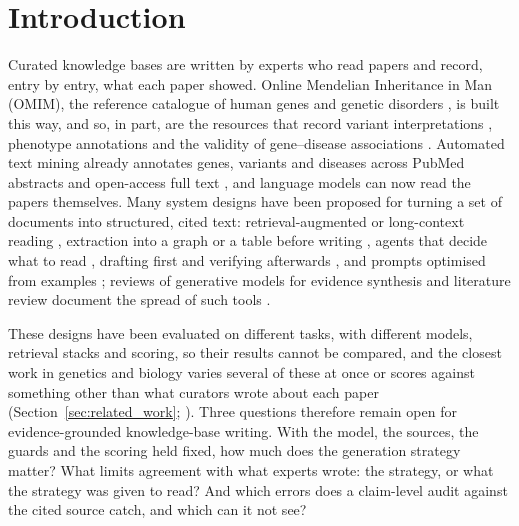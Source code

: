 \documentclass{article} %
\begin{document}
\section{Introduction}
\label{sec:intro}
Curated knowledge bases are written by experts who read papers and record, entry by entry, what each paper showed. Online Mendelian Inheritance in Man (OMIM), the reference catalogue of human genes and genetic disorders \citep{Amberger2014OmimorgOnline,amberger2019omim,hamosh2021online}, is built this way, and so, in part, are the resources that record variant interpretations \citep{Landrum2017ClinvarImproving,landrum2025clinvar}, phenotype annotations \citep{robinson2008human,gargano2024human} and the validity of gene--disease associations \citep{strande2017evaluating}. Automated text mining already annotates genes, variants and diseases across PubMed abstracts and open-access full text \citep{Wei2019PubtatorCentral,wei2024pubtator,allot2023tracking}, and language models can now read the papers themselves. Many system designs have been proposed for turning a set of documents into structured, cited text: retrieval-augmented or long-context reading \citep{Lewis2020RetrievalaugmentedGeneration,li2024retrieval}, extraction into a graph or a table before writing \citep{edge2024local,shankar2025docetl,joshi2026sliders}, agents that decide what to read \citep{Nakano2021WebgptBrowserassisted,Lla2023PaperqaRetrievalaugmented,skarlinski2024language}, drafting first and verifying afterwards \citep{Gao2022RarrResearching,dhuliawala2024chainofverification}, and prompts optimised from examples \citep{Khattab2023DspyCompiling,agrawal2026gepa}; reviews of generative models for evidence synthesis and literature review document the spread of such tools \citep{Clark2025GenerativeArtificial,scherbakov2025emergence,cao2025automation,wang2025accelerating}.

These designs have been evaluated on different tasks, with different models, retrieval stacks and scoring, so their results cannot be compared, and the closest work in genetics and biology varies several of these at once or scores against something other than what curators wrote about each paper (Section~\ref{sec:related_work}; \citealp{zhang2026flyaoc,yan2026genknowrd,skarlinski2024language,groza2026systematic}). Three questions therefore remain open for evidence-grounded knowledge-base writing. With the model, the sources, the guards and the scoring held fixed, how much does the generation strategy matter? What limits agreement with what experts wrote: the strategy, or what the strategy was given to read? And which errors does a claim-level audit against the cited source catch, and which can it not see?
\end{document}
